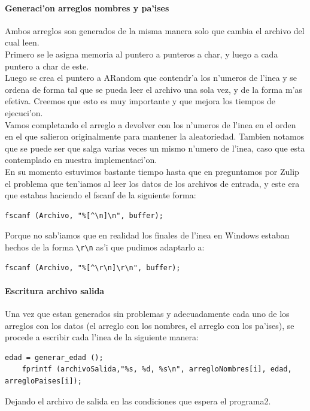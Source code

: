 \documentclass{article}
\begin{document}
	\paragraph{Generaci'on arreglos nombres y pa'ises}
	Ambos arreglos son generados de la misma manera solo que cambia el archivo del cual leen.\\
	Primero se le asigna memoria al puntero a punteros a char, y luego a cada puntero a char de este. \\
	Luego se crea el puntero a ARandom que contendr'a los n'umeros de l'inea y se ordena de forma tal que se pueda leer el archivo una sola vez, y de la forma m'as efetiva. Creemos que esto es muy importante y que mejora los tiempos de ejecuci'on.\\
	Vamos completando el arreglo a devolver con los n'umeros de l'inea en el orden en el que salieron originalmente para mantener la aleatoriedad.
	Tambien notamos que se puede ser que salga varias veces un mismo n'umero de l'inea, caso que esta contemplado en nuestra implementaci'on. \\
	En su momento estuvimos bastante tiempo hasta que en preguntamos por Zulip el problema que ten'iamos al leer los datos de los archivos de entrada, y este era que estabas haciendo el fscanf de la siguiente forma:
	\begin{lstlisting}[style=CStyle]
	fscanf (Archivo, "%[^\n]\n", buffer);
	\end{lstlisting}
	
	Porque no sab'iamos que en realidad los finales de l'inea en Windows estaban hechos de la forma \lstinline{\r\n} as'i que pudimos adaptarlo a:
	\begin{lstlisting}[style=CStyle]
	fscanf (Archivo, "%[^\r\n]\r\n", buffer);
	\end{lstlisting}
	
	\paragraph{Escritura archivo salida}
	Una vez que estan generados sin problemas y adecuadamente cada uno de los arreglos con los datos (el arreglo con los nombres, el arreglo con los pa'ises), se procede a escribir cada l'inea de la siguiente manera:
	\begin{lstlisting}[style=CStyle]
	edad = generar_edad ();
	fprintf (archivoSalida,"%s, %d, %s\n", arregloNombres[i], edad, arregloPaises[i]);
	\end{lstlisting}
	
	Dejando el archivo de salida en las condiciones que espera el programa2.
	\pagebreak
\end{document}
